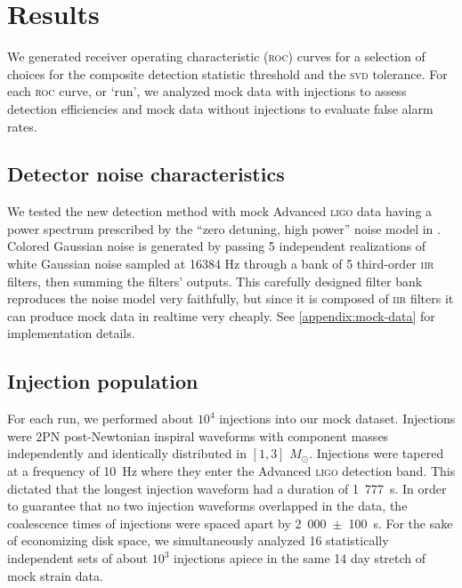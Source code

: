 \section{Results}
\label{SECIV}\label{sec:results}

We generated receiver operating characteristic (\textsc{roc}) curves for a selection of choices for the composite detection statistic threshold and the \textsc{svd} tolerance.  For each \textsc{roc} curve, or `run', we analyzed mock data with injections to assess detection efficiencies and mock data without injections to evaluate false alarm rates.

\subsection{Detector noise characteristics}

We tested the new detection method with mock Advanced \textsc{ligo} data having a power spectrum prescribed by the ``zero detuning, high power'' noise model in \cite{Shoemaker:2009p9770}.  Colored Gaussian noise is generated by passing 5 independent realizations of white Gaussian noise sampled at 16384 Hz through a bank of 5 third-order \textsc{iir} filters, then summing the filters' outputs.  This carefully designed filter bank reproduces the noise model very faithfully, but since it is composed of \textsc{iir} filters it can produce mock data in realtime very cheaply.  See \ref{appendix:mock-data} for implementation details. 

\subsection{Injection population}

For each run, we performed about $10^4$ injections into our mock dataset.  Injections were 2PN post-Newtonian inspiral waveforms with component masses independently and identically distributed in $[1, 3]$ $M_\odot$.  Injections were tapered at a frequency of 10~Hz where they enter the Advanced \textsc{ligo} detection band.  This dictated that the longest injection waveform had a duration of 1~777~s.  In order to guarantee that no two injection waveforms overlapped in the data, the coalescence times of injections were spaced apart by {\color{red} 2~000~$\pm$~100~s}.  For the sake of economizing disk space, we simultaneously analyzed {\color{red} 16 statistically independent sets} of about $10^3$ injections apiece in the same {\color{red} 14 day} stretch of mock strain data.

